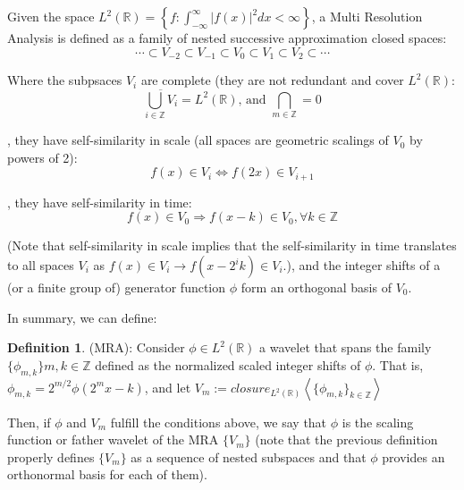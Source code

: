 \documentclass[12,twoside]{mammeTFM}
\theoremstyle{definition}
\newtheorem{definition}[thm]{Definition}
\theoremstyle{remark}
\newcommand{\Z}{\ensuremath{\mathbb{Z}}}
\newcommand{\R}{\ensuremath{\mathbb{R}}}
\begin{document}
Given the space $L^2(\R) = \left\{f: \int_{-\infty}^{\infty}{|f(x)|^2 dx < \infty} \right\}$, a Multi Resolution Analysis is defined as 
a family of nested successive approximation closed spaces:
$$ \cdots \subset V_{-2} \subset V_{-1} \subset V_0 \subset V_1 \subset V_2 \subset \cdots $$

Where the subpsaces $V_i$ are complete (they are not redundant and cover $L^2(\R)$:
$$\overline{\bigcup_{i\in{\Z}}{V_i}} = L^2(\R) \text{, and } \bigcap_{m\in{\Z}} = {0}$$

, they have self-similarity in scale (all spaces are geometric scalings of $V_0$ by powers of 2):
$$ f(x) \in V_i \Leftrightarrow f(2x) \in V_{i + 1} $$

, they have self-similarity in time:
$$ f(x) \in V_0 \Rightarrow f(x - k) \in V_0, \forall k \in \Z $$

(Note that self-similarity in scale implies that the self-similarity in time translates to all spaces $V_i$ as $f(x) \in V_i \rightarrow f(x - 2^i k) \in V_i$.), and the integer shifts of a (or a finite group of) generator function $\phi$ form an orthogonal basis of $V_0$. 

In summary, we can define:

\begin{definition} \label{def:mra} (MRA): Consider $\phi \in L^2(\R)$ a wavelet that spans the family $\{\phi_{m,k}\}m,k\in\Z$ defined as the normalized scaled integer shifts of $\phi$. That is, $\phi_{m,k} = 2^{m/2}\phi(2^m x - k)$, and let $V_m := closure_{L^2(\R)}\left\langle\{\phi_{m,k}\}_{k \in \Z}\right\rangle$ 
\end{definition}

Then, if $\phi$ and $V_m$ fulfill the conditions above, we say that $\phi$ is the scaling function or father wavelet of the MRA $\{V_m\}$ (note that the previous definition properly defines $\{V_m\}$ as a sequence of nested subspaces and that $\phi$ provides an orthonormal basis for each of them).
\end{document}
